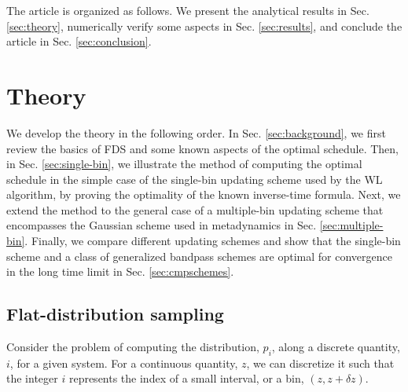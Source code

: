 \documentclass[reprint, superscriptaddress, floatfix]{revtex4-1}
\begin{document}
%



The article is organized as follows.
%
We present the analytical results in Sec. \ref{sec:theory},
numerically verify some aspects
in Sec. \ref{sec:results},
and conclude the article
in Sec. \ref{sec:conclusion}.




\section{\label{sec:theory}
Theory}



We develop the theory
in the following order.
%
In Sec. \ref{sec:background},
we first review the basics of FDS
and some known aspects of the optimal schedule.
%
Then, in Sec. \ref{sec:single-bin},
we illustrate the method of
computing the optimal schedule
in the simple case of the
single-bin updating scheme
used by the WL algorithm,
by proving the optimality
of the known inverse-time formula.
%
%
Next, we extend the method to the general case
of a multiple-bin updating scheme
that encompasses the Gaussian scheme used in metadynamics
in Sec. \ref{sec:multiple-bin}.
%
Finally, we compare different updating schemes
and show that the single-bin scheme
and a class of generalized bandpass schemes
are optimal for convergence
in the long time limit
in Sec. \ref{sec:cmpschemes}.



\subsection{\label{sec:background}
Flat-distribution sampling}






Consider the problem of computing
the distribution, $p_i$,
along a discrete quantity, $i$,
for a given system.
%
%
For a continuous quantity, $z$,
we can discretize it
such that the integer $i$ represents
the index of a small interval, or a bin,
$(z, z + \delta z)$.
%
\end{document}
